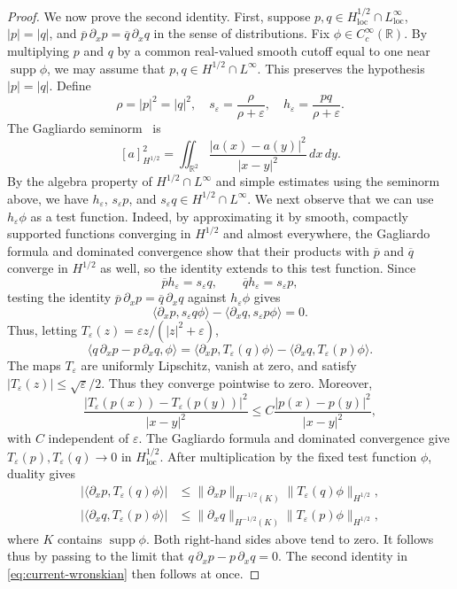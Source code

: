 \documentclass[11pt]{amsart}
\theoremstyle{remark}
\newcommand{\R}{\mathbb R}
\newcommand{\supp}{\operatorname{supp}}
\newcommand{\1}{\mathbf 1}
\newcommand{\loc}{\mathrm{loc}}
\begin{document}
\begin{proof}
We now prove the second identity. First, suppose
$p,q\in H^{1/2}_{\loc}\cap L^\infty_{\loc}$,
$|p|=|q|$, and
$\overline p\,\partial_xp=\overline q\,\partial_xq$ in the sense of distributions. Fix $\phi\in C_c^\infty(\R)$. By multiplying $p$ and $q$ by a
common real-valued smooth cutoff equal to one near $\supp\phi$,
we may assume that $p,q\in H^{1/2}\cap L^\infty$.
This preserves the hypothesis $|p|=|q|$. Define
\[
 \rho=|p|^2=|q|^2,
 \quad s_\varepsilon=\frac{\rho}{\rho+\varepsilon},
 \quad h_\varepsilon=\frac{pq}{\rho+\varepsilon}.
\]
The Gagliardo seminorm~\cite{DiNezzaPalatucciValdinoci} is
\[
 [a]_{H^{1/2}}^2=\iint_{\R^2}
 \frac{|a(x)-a(y)|^2}{|x-y|^2}\,dx\,dy.
\]
By the algebra property of $H^{1/2}\cap L^\infty$ and simple estimates using the seminorm above, we have 
$h_\varepsilon$, $s_\varepsilon p$, and $s_\varepsilon q\in H^{1/2}\cap L^\infty$.  We next observe that we can use $h_\varepsilon\phi$ as a test function. Indeed, by approximating it by smooth, compactly supported functions converging in
$H^{1/2}$ and almost everywhere, the Gagliardo formula and dominated
convergence show that their products with $\overline p$ and $\overline q$
converge in $H^{1/2}$ as well, so the identity extends to this test function.
Since
\[
 \overline p h_\varepsilon=s_\varepsilon q,
 \qquad
 \overline q h_\varepsilon=s_\varepsilon p,
\]
testing the identity $\overline p\,\partial_xp=\overline q\,\partial_xq$
against $h_\varepsilon\phi$ gives
\[
 \langle\partial_xp,s_\varepsilon q\phi\rangle
 -\langle\partial_xq,s_\varepsilon p\phi\rangle=0.
\]
Thus, letting $T_\varepsilon(z)=\varepsilon z/(|z|^2+\varepsilon)$,
\[
 \langle q\,\partial_xp-p\,\partial_xq,\phi\rangle
 =\langle\partial_xp,T_\varepsilon(q)\phi\rangle
  -\langle\partial_xq,T_\varepsilon(p)\phi\rangle.
\]
The maps $T_\varepsilon$ are uniformly Lipschitz, vanish at zero, and satisfy
$|T_\varepsilon(z)|\le\sqrt\varepsilon/2$.  Thus they converge pointwise to
zero.  Moreover,
\[
 \frac{|T_\varepsilon(p(x))-T_\varepsilon(p(y))|^2}{|x-y|^2}
 \le C\frac{|p(x)-p(y)|^2}{|x-y|^2},
\]
with $C$ independent of $\varepsilon$.  The Gagliardo formula and dominated
convergence give
$T_\varepsilon(p),T_\varepsilon(q)\to0$ in $H^{1/2}_{\loc}$.  After
multiplication by the fixed test function $\phi$, duality gives
\begin{align*}
 |\langle\partial_xp,T_\varepsilon(q)\phi\rangle|
 &\le \|\partial_xp\|_{H^{-1/2}(K)}
       \|T_\varepsilon(q)\phi\|_{H^{1/2}},\\
 |\langle\partial_xq,T_\varepsilon(p)\phi\rangle|
 &\le \|\partial_xq\|_{H^{-1/2}(K)}
       \|T_\varepsilon(p)\phi\|_{H^{1/2}},
\end{align*}
where $K$ contains $\supp\phi$.  Both right-hand sides above tend to zero.  It follows thus by passing to
the limit that $q\,\partial_xp-p\,\partial_xq=0$. The second identity in
\eqref{eq:current-wronskian} then follows at once. 
\end{proof}
\end{document}
